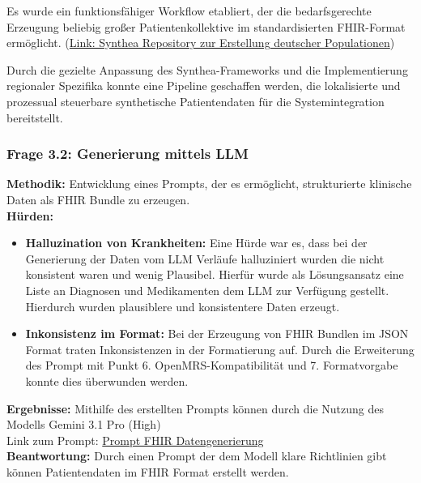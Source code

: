 \begin{description}[style=nextline, font=\bfseries]
    \item[Ergebnisse] 
    Es wurde ein funktionsfähiger Workflow etabliert, der die bedarfsgerechte Erzeugung beliebig großer Patientenkollektive im standardisierten FHIR-Format ermöglicht. (\href{https://github.com/robinhefner/synthea-ger}{Link: Synthea Repository zur Erstellung deutscher Populationen})

    \item[Beantwortung] 
    Durch die gezielte Anpassung des Synthea-Frameworks und die Implementierung regionaler Spezifika konnte eine Pipeline geschaffen werden, die lokalisierte und prozessual steuerbare synthetische Patientendaten für die Systemintegration bereitstellt.

\end{description}

\subsubsection{Frage 3.2: Generierung mittels LLM} 
\textbf{Methodik:} Entwicklung eines Prompts, der es ermöglicht, strukturierte klinische Daten als FHIR Bundle zu erzeugen. \\
\textbf{Hürden:} 
\begin{itemize}
    \item \textbf{Halluzination von Krankheiten:} Eine Hürde war es, dass bei der Generierung der Daten vom LLM Verläufe halluziniert wurden die nicht konsistent waren und wenig Plausibel. Hierfür wurde als Lösungsansatz eine Liste an Diagnosen und Medikamenten dem LLM zur Verfügung gestellt. Hierdurch wurden plausiblere und konsistentere Daten erzeugt.
    \item  \textbf{Inkonsistenz im Format:} Bei der Erzeugung von FHIR Bundlen im JSON Format traten Inkonsistenzen in der Formatierung auf. Durch die Erweiterung des Prompt mit Punkt 6. OpenMRS-Kompatibilität  und 7. Formatvorgabe konnte dies überwunden werden. 
\end{itemize}

\textbf{Ergebnisse:} Mithilfe des erstellten Prompts können durch die Nutzung des Modells Gemini 3.1 Pro (High) \\

Link zum Prompt:
\href{https://github.com/robinhefner/Research-Project/blob/e212d9b0d35173136eb8706f443504a473cea27e/Prompt_FHIR_Datengenerierung.md}{Prompt FHIR Datengenerierung}
\\


\textbf{Beantwortung:} Durch einen Prompt der dem Modell klare Richtlinien gibt können Patientendaten im FHIR Format erstellt werden.\\


